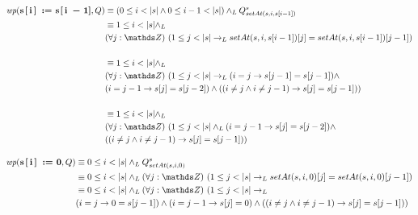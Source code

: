 \begin{enumerate}[label=\alph*)]
          $
              \begin{aligned}
                  \wp{s[i] := s[i - 1]}{Q} & \equiv (0 \leq i < |s| \land 0 \leq i - 1 < |s|) \yLuego Q_{setAt(s, i, s[i-1])}^s              \\
                                           & \equiv 1 \leq i < |s| \yLuego                                                                   \\
                                           & \paraTodo{j}{\ent}{1 \leq j < |s| \thenLuego setAt(s, i, s[i-1])[j] = setAt(s, i, s[i-1])[j-1]} \\\\
                                           & \equiv 1 \leq i < |s| \yLuego                                                                   \\
                                           & \paraTodo{j}{\ent}{1 \leq j < |s| \thenLuego (i = j \Then s[j-1] = s[j-1]) \land                \\
                                           & (i = j - 1 \Then s[j] = s[j-2]) \land ((i \neq j \land i \neq j - 1) \Then s[j] = s [j-1])}     \\\\
                                           & \equiv 1 \leq i < |s| \yLuego                                                                   \\
                                           & \paraTodo{j}{\ent}{1 \leq j < |s| \yLuego (i = j - 1 \Then s[j] = s[j-2]) \land                 \\
                                           & ((i \neq j \land i \neq j - 1) \Then s[j] = s[j-1])}
              \end{aligned}
          $

          $
              \begin{aligned}
                  \wp{s[i] := 0}{Q} & \equiv 0 \leq i < |s| \yLuego Q_{setAt(s, i, 0)}^s                                                                  \\
                                    & \equiv 0 \leq i < |s| \yLuego \paraTodo{j}{\ent}{1 \leq j < |s| \thenLuego setAt(s, i, 0)[j] = setAt(s, i, 0)[j-1]} \\
                                    & \equiv 0 \leq i < |s| \yLuego \paraTodo{j}{\ent}{1 \leq j < |s| \thenLuego                                          \\
                                    & (i = j \Then 0 = s[j-1]) \land (i = j-1 \Then s[j] = 0) \land ((i \neq j \land i \neq j-1) \Then s[j] = s[j-1])}
              \end{aligned}
          $


\end{enumerate}

